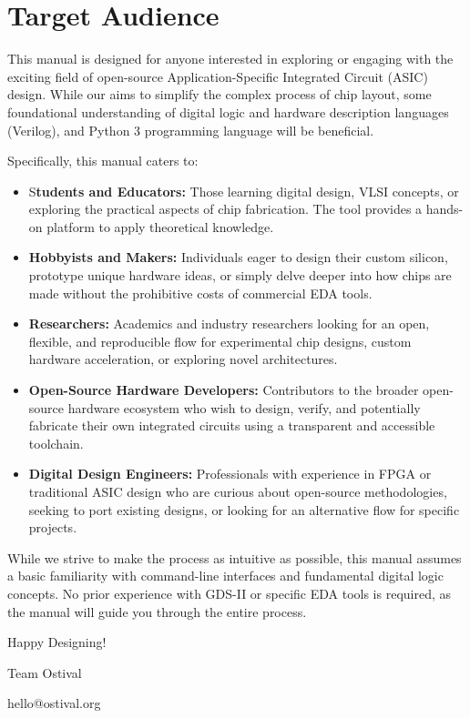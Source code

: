 \chapter*{Target Audience}

This manual is designed for anyone interested in exploring or engaging with the exciting field of open-source Application-Specific Integrated Circuit (ASIC) design. While our aims to simplify the complex process of chip layout, some foundational understanding of digital logic and hardware description languages (Verilog), and Python 3 programming language will be beneficial.

Specifically, this manual caters to:

\begin{itemize}
    \item S\textbf{tudents and Educators:} Those learning digital design, VLSI concepts, or exploring the practical aspects of chip fabrication. The tool provides a hands-on platform to apply theoretical knowledge.
    \item \textbf{Hobbyists and Makers:} Individuals eager to design their custom silicon, prototype unique hardware ideas, or simply delve deeper into how chips are made without the prohibitive costs of commercial EDA tools.
    \item \textbf{Researchers:} Academics and industry researchers looking for an open, flexible, and reproducible flow for experimental chip designs, custom hardware acceleration, or exploring novel architectures.
    \item \textbf{Open-Source Hardware Developers:} Contributors to the broader open-source hardware ecosystem who wish to design, verify, and potentially fabricate their own integrated circuits using a transparent and accessible toolchain.
    \item \textbf{Digital Design Engineers:} Professionals with experience in FPGA or traditional ASIC design who are curious about open-source methodologies, seeking to port existing designs, or looking for an alternative flow for specific projects.
\end{itemize}

While we strive to make the process as intuitive as possible, this manual assumes a basic familiarity with command-line interfaces and fundamental digital logic concepts. No prior experience with GDS-II or specific EDA tools is required, as the manual will guide you through the entire process.


\vfill

Happy Designing!

Team Ostival

hello@ostival.org
